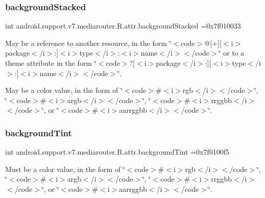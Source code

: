 \subsubsection{\texorpdfstring{background\+Stacked}{backgroundStacked}}
{\footnotesize\ttfamily int android.\+support.\+v7.\+mediarouter.\+R.\+attr.\+background\+Stacked =0x7f010033\hspace{0.3cm}{\ttfamily [static]}}

May be a reference to another resource, in the form \char`\"{}$<$code$>$@\mbox{[}+\mbox{]}\mbox{[}$<$i$>$package$<$/i$>$\+:\mbox{]}$<$i$>$type$<$/i$>$\+:$<$i$>$name$<$/i$>$$<$/code$>$\char`\"{} or to a theme attribute in the form \char`\"{}$<$code$>$?\mbox{[}$<$i$>$package$<$/i$>$\+:\mbox{]}\mbox{[}$<$i$>$type$<$/i$>$\+:\mbox{]}$<$i$>$name$<$/i$>$$<$/code$>$\char`\"{}. 

May be a color value, in the form of \char`\"{}$<$code$>$\#$<$i$>$rgb$<$/i$>$$<$/code$>$\char`\"{}, \char`\"{}$<$code$>$\#$<$i$>$argb$<$/i$>$$<$/code$>$\char`\"{}, \char`\"{}$<$code$>$\#$<$i$>$rrggbb$<$/i$>$$<$/code$>$\char`\"{}, or \char`\"{}$<$code$>$\#$<$i$>$aarrggbb$<$/i$>$$<$/code$>$\char`\"{}. \mbox{\label{classandroid_1_1support_1_1v7_1_1mediarouter_1_1R_1_1attr_a3462fb05b26ddf9e114524febcf9fd1c}} 
\subsubsection{\texorpdfstring{background\+Tint}{backgroundTint}}
{\footnotesize\ttfamily int android.\+support.\+v7.\+mediarouter.\+R.\+attr.\+background\+Tint =0x7f0100f5\hspace{0.3cm}{\ttfamily [static]}}

Must be a color value, in the form of \char`\"{}$<$code$>$\#$<$i$>$rgb$<$/i$>$$<$/code$>$\char`\"{}, \char`\"{}$<$code$>$\#$<$i$>$argb$<$/i$>$$<$/code$>$\char`\"{}, \char`\"{}$<$code$>$\#$<$i$>$rrggbb$<$/i$>$$<$/code$>$\char`\"{}, or \char`\"{}$<$code$>$\#$<$i$>$aarrggbb$<$/i$>$$<$/code$>$\char`\"{}. 

